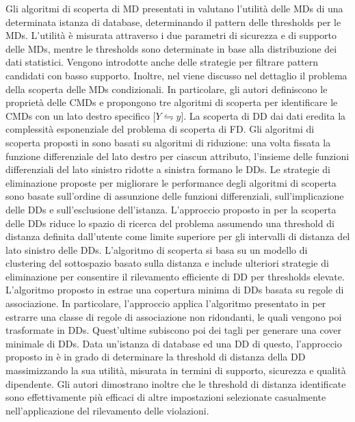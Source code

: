 Gli algoritmi di scoperta di MD presentati in \cite{efficientdiscoveryofsimilarity} valutano l'utilit\`{a} delle MDs di una determinata istanza di database, determinando il pattern delle thresholds per le MDs. L'utilit\`{a} \`{e} misurata attraverso i due parametri di sicurezza e di supporto delle MDs, mentre le thresholds sono determinate in base alla distribuzione dei dati statistici. Vengono introdotte anche delle strategie per filtrare pattern candidati con basso supporto. Inoltre, nel \cite{discoveringconditionalmatchingrules} viene discusso nel dettaglio il problema della scoperta delle MDs condizionali. In particolare, gli autori definiscono le propriet\`{a} delle CMDs e propongono tre algoritmi di scoperta per identificare le CMDs con un lato destro specifico [$Y\leftrightharpoons y$]. La scoperta di DD dai dati eredita la complessit\`{a} esponenziale del problema di scoperta di FD. Gli algoritmi di scoperta proposti in \cite{differentialdependencies} sono basati su algoritmi di riduzione: una volta fissata la funzione differenziale del lato destro per ciascun attributo, l'insieme delle funzioni differenziali del lato sinistro ridotte a sinistra formano le DDs. Le strategie di eliminazione proposte per migliorare le performance degli algoritmi di scoperta sono basate sull'ordine di assunzione delle funzioni differenziali, sull'implicazione delle DDs e sull'esclusione dell'istanza. L'approccio proposto in \cite{miningdd} per la scoperta delle DDs riduce lo spazio di ricerca del problema assumendo una threshold di distanza definita dall'utente come limite superiore per gli intervalli di distanza del lato sinistro delle DDs. L'algoritmo di scoperta si basa su un modello di clustering del sottospazio basato sulla distanza e include ulteriori strategie di eliminazione per consentire il rilevamento efficiente di DD per thresholds elevate. L'algoritmo proposto in \cite{efficientdiscoverydd} estrae una copertura minima di DDs basata su regole di associazione. In particolare, l'approccio applica l'algoritmo presentato in \cite{optimalrulediscovry} per estrarre una classe di regole di associazione non ridondanti, le quali vengono poi trasformate in DDs. Quest'ultime subiscono poi dei tagli per generare una cover minimale di DDs. Data un'istanza di database ed una DD di questo, l'approccio proposto in \cite{efficientdeterminationofdistance4dd} \`{e} in grado di determinare la threshold di distanza della DD massimizzando la sua utilit\`{a}, misurata in termini di supporto, sicurezza e qualit\`{a} dipendente. Gli autori dimostrano inoltre che le threshold di distanza identificate sono effettivamente pi\`{u} efficaci di altre impostazioni selezionate casualmente nell'applicazione del rilevamento delle violazioni.
